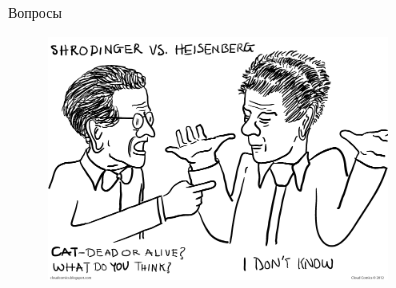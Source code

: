 \documentclass[10pt,pdf,hyperref={unicode}]{beamer}
\begin{document}
\begin{frame}{Вопросы}
 \begin{figure} 
   \includegraphics[width=90mm,scale=0.5]{questions.png}
  \end{figure}
\end{frame}
\end{document}
